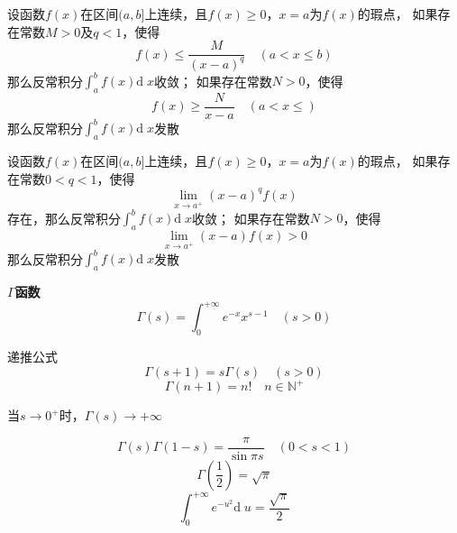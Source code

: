 \documentclass[UTF8]{ctexart}
\newcommand{\dif}[1]{\text{d}\;\!#1}
\begin{document}
\bigskip

设函数$f(x)$在区间$(a,b]$上连续，且$f(x)\ge0$，$x=a$为$f(x)$的瑕点，
如果存在常数$M>0$及$q<1$，使得
\[ f(x)\le\frac{M}{(x-a)^q} \quad(a<x\le b)\]
那么反常积分$\int_a^bf(x)\dif{x}$收敛；
如果存在常数$N>0$，使得
\[ f(x)\ge\frac{N}{x-a}\quad(a<x\le ) \]
那么反常积分$\int_a^bf(x)\dif{x}$发散

设函数$f(x)$在区间$(a,b]$上连续，且$f(x)\ge0$，$x=a$为$f(x)$的瑕点，
如果存在常数$0<q<1$，使得
\[ \lim_{x\to a^+}(x-a)^qf(x)\]
存在，那么反常积分$\int_a^bf(x)\dif{x}$收敛；
如果存在常数$N>0$，使得
\[ \lim_{x\to a^+}(x-a)f(x)>0\]
那么反常积分$\int_a^bf(x)\dif{x}$发散

\bigskip

\textbf{$\Gamma$函数}
\[\Gamma(s)=\int_0^{+\infty}e^{-x}x^{s-1}\quad(s>0)\]

\bigskip

递推公式
\[\Gamma(s+1)=s\Gamma(s)\quad(s>0)\]
\[\Gamma(n+1)=n!\quad n\in\mathbb{N}^+\]

当$s\to0^+$时，$\Gamma(s)\to+\infty$

\[\Gamma(s)\Gamma(1-s)=\frac{\pi}{\sin \pi s}\quad(0<s<1)\]
\[\Gamma(\frac{1}{2})=\sqrt{\pi}\]
\[\int_0^{+\infty}e^{-u^2}\dif{u}=\frac{\sqrt{\pi}}{2}\]
\end{document}
